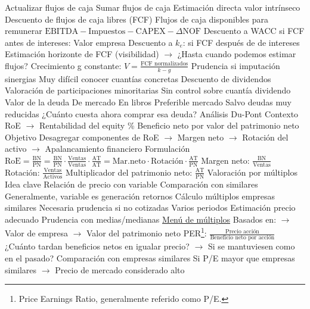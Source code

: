 \documentclass{nuevotema}
\begin{document}
\begin{esquemal}
				\4 Actualizar flujos de caja
				\4 Sumar flujos de caja
				\4[$\Rightarrow$] Estimación directa valor intrínseco
			\3 Descuento de flujos de caja libres (FCF)
				\4 Flujos de caja disponibles para remunerar
				\4[] $\text{EBITDA} - \text{Impuestos} - \text{CAPEX} - \varDelta \text{NOF}$
				\4 Descuento a WACC si FCF antes de intereses:
				\4[] Valor empresa
				\4 Descuento a $k_e$:
				\4[] si FCF después de de intereses
				\4 Estimación horizonte de FCF (visibilidad)
				\4[] $\to$ ¿Hasta cuando podemos estimar flujos?
				\4 Crecimiento g constante: $V = \frac{\text{FCF normalizados}}{k-g}$
				\4 Prudencia si imputación sinergias
				\4[] Muy difícil conocer cuantías concretas
			\3 Descuento de dividendos
				\4 Valoración de participaciones minoritarias
				\4[] Sin control sobre cuantía dividendo
			\3 Valor de la deuda
				\4 De mercado
				\4 En libros
				\4 Preferible mercado
				\4[] Salvo deudas muy reducidas
				\4[$\Rightarrow$] ¿Cuánto cuesta ahora comprar esa deuda?
			\3 Análisis Du-Pont
				\4 Contexto
				\4[] RoE
				\4[] $\to$ Rentabilidad del equity
				\4[] \% Beneficio neto por valor del patrimonio neto
				\4 Objetivo
				\4[] Desagregar componentes de RoE
				\4[] $\to$ Margen neto
				\4[] $\to$ Rotación del activo
				\4[] $\to$ Apalancamiento financiero
				\4 Formulación
				\4[] $\text{RoE} = \frac{\text{BN}}{\text{PN}} = \frac{\text{BN}}{\text{PN}} \cdot \frac{\text{Ventas}}{\text{Ventas}} \cdot \frac{\text{AT}}{\text{AT}} = \text{Mar.neto} \cdot \text{Rotación} \cdot \frac{\text{AT}}{\text{PN}} $
				\4[] Margen neto: $\frac{\text{BN}}{\text{Ventas}}$
				\4[] Rotación: $\frac{\text{Ventas}}{\text{Activos}}$
				\4[] Multiplicador del patrimonio neto: $\frac{\text{AT}}{\text{PN}}$
		\2 Valoración por múltiplos
			\3 Idea clave
				\4 Relación de precio con variable
				\4 Comparación con similares
				\4 Generalmente, variable es generación retornos
				\4 Cálculo múltiplos empresas similares
				\4[] Necesaria prudencia si no cotizadas
				\4 Varios periodos
				\4 Estimación precio adecuado
				\4 Prudencia con medias/medianas
			\3 \underline{Menú de múltiplos}
				\4 Basados en:
				\4[] $\to$ Valor de empresa
				\4[] $\to$ Valor del patrimonio neto
			\3 PER\footnote{Price Earnings Ratio, generalmente referido como P/E.}:
				\4[] $\frac{\text{Precio acción}}{\text{Beneficio neto por acción}}$
				\4[] ¿Cuánto tardan beneficios netos en igualar precio?
				\4[] $\to$ Si se mantuviesen como en el pasado?
				\4[] Comparación con empresas similares
				\4[] Si P/E mayor que empresas similares
				\4[] $\to$ Precio de mercado considerado alto

\end{esquemal}
\end{document}
